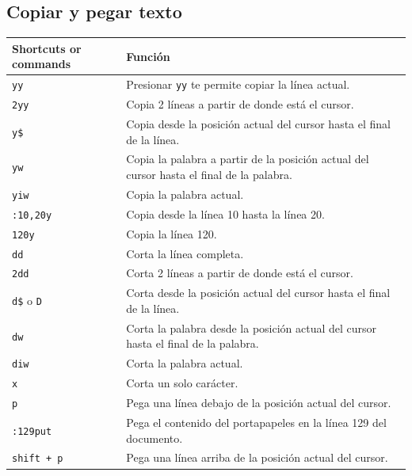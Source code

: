 \documentclass[
  doc,
  floatsintext,
  longtable,
  a4paper,
  nolmodern,
  notxfonts,
  notimes,
  12pt,
  colorlinks=true,linkcolor=blue,citecolor=blue,urlcolor=blue]{apa7}
\newcounter{none} %
\begin{document}
\subsection{Copiar y pegar texto}\label{copiar-y-pegar-texto}

{\def\LTcaptype{none} %
\begin{longtable}[]{@{}
  >{\raggedright\arraybackslash}p{}
  >{\raggedright\arraybackslash}p{}@{}}
\toprule\noalign{}
\begin{minipage}[b]{\linewidth}\raggedright
Shortcuts or commands
\end{minipage} & \begin{minipage}[b]{\linewidth}\raggedright
Función
\end{minipage} \\
\midrule\noalign{}
\endhead
\bottomrule\noalign{}
\endlastfoot
\texttt{yy} & Presionar \texttt{yy} te permite copiar la línea
actual. \\
\texttt{2yy} & Copia 2 líneas a partir de donde está el cursor. \\
\texttt{y\$} & Copia desde la posición actual del cursor hasta el final
de la línea. \\
\texttt{yw} & Copia la palabra a partir de la posición actual del cursor
hasta el final de la palabra. \\
\texttt{yiw} & Copia la palabra actual. \\
\texttt{:10,20y} & Copia desde la línea 10 hasta la línea 20. \\
\texttt{120y} & Copia la línea 120. \\
\texttt{dd} & Corta la línea completa. \\
\texttt{2dd} & Corta 2 líneas a partir de donde está el cursor. \\
\texttt{d\$} o \texttt{D} & Corta desde la posición actual del cursor
hasta el final de la línea. \\
\texttt{dw} & Corta la palabra desde la posición actual del cursor hasta
el final de la palabra. \\
\texttt{diw} & Corta la palabra actual. \\
\texttt{x} & Corta un solo carácter. \\
\texttt{p} & Pega una línea debajo de la posición actual del cursor. \\
\texttt{:129put} & Pega el contenido del portapapeles en la línea 129
del documento. \\
\texttt{shift\ +\ p} & Pega una línea arriba de la posición actual del
cursor. \\
\end{longtable}
}
\end{document}
